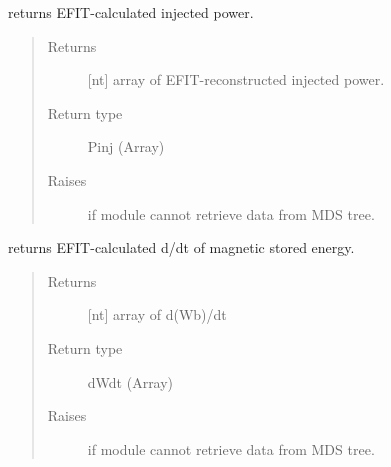 \documentclass[letterpaper,10pt,english]{sphinxmanual}
\begin{document}
\begin{fulllineitems}
\begin{fulllineitems}
\end{fulllineitems}


\begin{fulllineitems}
\label{\detokenize{eqtools:eqtools.EFIT.EFITTree.getPinj}}
returns EFIT-calculated injected power.
\begin{quote}\begin{description}
\item[{Returns}] \leavevmode
{[}nt{]} array of EFIT-reconstructed injected power.

\item[{Return type}] \leavevmode
Pinj (Array)

\item[{Raises}] \leavevmode
{} \textendash{} if module cannot retrieve data from MDS tree.

\end{description}\end{quote}

\end{fulllineitems}


\begin{fulllineitems}
\label{\detokenize{eqtools:eqtools.EFIT.EFITTree.getWbdot}}
returns EFIT-calculated d/dt of magnetic stored energy.
\begin{quote}\begin{description}
\item[{Returns}] \leavevmode
{[}nt{]} array of d(Wb)/dt

\item[{Return type}] \leavevmode
dWdt (Array)

\item[{Raises}] \leavevmode
{} \textendash{} if module cannot retrieve data from MDS tree.

\end{description}\end{quote}

\end{fulllineitems}


\end{fulllineitems}
\end{document}
